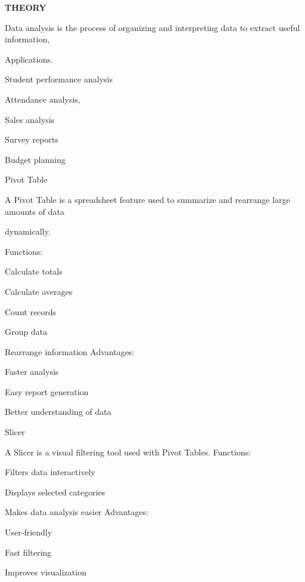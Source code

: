 \documentclass[10pt,a4paper]{article}
\begin{document}
\medskip\noindent\textbf{THEORY}\par
\noindent Data analysis is the process of organizing and interpreting data to extract useful information,\par
\noindent Applications.\par
\noindent\textbullet\; Student performance analysis\par
\noindent\textbullet\; Attendance analysis,\par
\noindent\textbullet\; Sales analysis\par
\noindent\textbullet\; Survey reports\par
\noindent\textbullet\; Budget planning\par

\noindent Pivot Table\par
\noindent A Pivot Table is a spreadsheet feature used to summarize and rearrange large amounts of data\par
\noindent dynamically.\par

\noindent Functions:\par
\noindent\textbullet\; Calculate totals\par
\noindent\textbullet\; Calculate averages\par
\noindent\textbullet\; Count records\par
\noindent\textbullet\; Group data\par
\noindent\textbullet\; Rearrange information Advantages:\par
\noindent\textbullet\; Faster analysis\par
\noindent\textbullet\; Easy report generation\par
\noindent\textbullet\; Better understanding of data\par

\noindent Slicer\par
\clearpage
\noindent A Slicer is a visual filtering tool used with Pivot Tables. Functions:\par
\noindent\textbullet\; Filters data interactively\par
\noindent\textbullet\; Displays selected categories\par
\noindent\textbullet\; Makes data analysis easier Advantages:\par
\noindent\textbullet\; User-friendly\par
\noindent\textbullet\; Fast filtering\par
\noindent\textbullet\; Improves visualization\par
\end{document}
